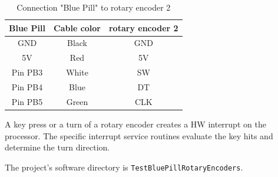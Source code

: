 \documentclass[11pt, oneside]{scrartcl}   	%
\begin{document}
\begin{table}[htbp]
	\centering
	\begin{tabular}{|c|c|c|}		
	\hline
		\textbf{Blue Pill} & \textbf{Cable color} & \textbf{rotary encoder 2} \\
		\hline
		GND & Black & GND \\
		\hline
		5V & Red & 5V \\
		\hline
		Pin PB3 & White & SW \\
		\hline
		Pin PB4 & Blue & DT \\
		\hline
		Pin PB5 & Green & CLK \\
		\hline
	\end{tabular}
	\caption{Connection "Blue Pill" to rotary encoder 2}
	\label{table:ConnectionRotEnc2}
\end{table}
A key press or a turn of a rotary encoder creates a HW interrupt on the processor. The specific interrupt service routines evaluate the key hits and determine the turn direction.

The project's software directory is \verb!TestBluePillRotaryEncoders!.


\newpage
\end{document}
